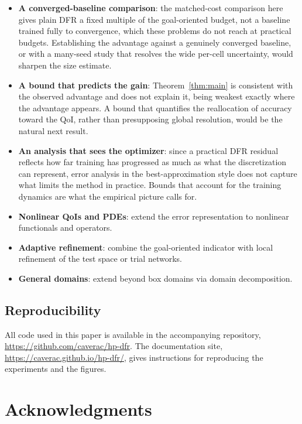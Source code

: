 \documentclass[preprint,11pt]{elsarticle}
\begin{document}
\begin{itemize}
    \item \textbf{A converged-baseline comparison}: the matched-cost comparison here gives plain DFR a fixed multiple of the goal-oriented budget, not a baseline trained fully to convergence, which these problems do not reach at practical budgets. Establishing the advantage against a genuinely converged baseline, or with a many-seed study that resolves the wide per-cell uncertainty, would sharpen the size estimate.
    \item \textbf{A bound that predicts the gain}: Theorem~\ref{thm:main} is consistent with the observed advantage and does not explain it, being weakest exactly where the advantage appears. A bound that quantifies the reallocation of accuracy toward the QoI, rather than presupposing global resolution, would be the natural next result.
    \item \textbf{An analysis that sees the optimizer}: since a practical DFR residual reflects how far training has progressed as much as what the discretization can represent, error analysis in the best-approximation style does not capture what limits the method in practice. Bounds that account for the training dynamics are what the empirical picture calls for.
    \item \textbf{Nonlinear QoIs and PDEs}: extend the error representation to nonlinear functionals and operators.
    \item \textbf{Adaptive refinement}: combine the goal-oriented indicator with local refinement of the test space or trial networks.
    \item \textbf{General domains}: extend beyond box domains via domain decomposition.
\end{itemize}

\subsection{Reproducibility}

All code used in this paper is available in the accompanying repository, \url{https://github.com/caverac/hp-dfr}. The documentation site, \url{https://caverac.github.io/hp-dfr/}, gives instructions for reproducing the experiments and the figures.

\section*{Acknowledgments}
\end{document}
